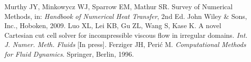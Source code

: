 \documentclass[dvips, 11pt, a4paper]{article}
\begin{document}
\begin{thebibliography}{}
 Murthy JY, Minkowycz WJ, Sparrow EM, Mathur
  SR. Survey of Numerical Methods, in: \textsl{Handbook of Numerical
    Heat Transfer}, 2nd Ed.  John Wiley \& Sons, Inc., Hoboken, 2009.
 Luo XL, Lei KB, Gu ZL, Wang S, Kase K.  A novel
  {C}artesian cut cell solver for incompressible viscous flow in
  irregular domains.  \textsl{Int. J. Numer. Meth. Fluids} [In press].
 Ferziger JH, Peri{\'c} M. \textsl{Computational
    Methods for Fluid Dynamics}.  Springer, Berlin, 1996.
\end{thebibliography}
\end{document}
